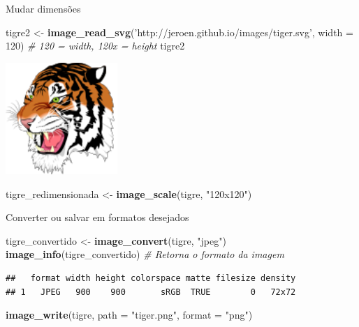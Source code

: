 \documentclass[
  ignorenonframetext,
]{beamer}
\newenvironment{Shaded}{\begin{snugshade}}{\end{snugshade}}
\newcommand{\CommentTok}[1]{\textcolor[rgb]{0.56,0.35,0.01}{\textit{#1}}}
\newcommand{\DataTypeTok}[1]{\textcolor[rgb]{0.13,0.29,0.53}{#1}}
\newcommand{\DecValTok}[1]{\textcolor[rgb]{0.00,0.00,0.81}{#1}}
\newcommand{\KeywordTok}[1]{\textcolor[rgb]{0.13,0.29,0.53}{\textbf{#1}}}
\newcommand{\NormalTok}[1]{#1}
\newcommand{\StringTok}[1]{\textcolor[rgb]{0.31,0.60,0.02}{#1}}
\begin{document}
\begin{frame}[fragile]{Mudar dimensões}
\protect\hypertarget{mudar-dimensuxf5es-1}{}

\small

\begin{Shaded}
\begin{Highlighting}[]
\NormalTok{tigre2 <-}\StringTok{ }\KeywordTok{image_read_svg}\NormalTok{(}\StringTok{'http://jeroen.github.io/images/tiger.svg'}\NormalTok{,}
                         \DataTypeTok{width =} \DecValTok{120}\NormalTok{) }\CommentTok{# 120 = width, 120x = height}
\NormalTok{tigre2}
\end{Highlighting}
\end{Shaded}

\includegraphics[width=1.67in]{SLIDES_files/figure-beamer/2.1-1}

\begin{Shaded}
\begin{Highlighting}[]
\NormalTok{tigre_redimensionada <-}\StringTok{ }\KeywordTok{image_scale}\NormalTok{(tigre, }\StringTok{"120x120"}\NormalTok{)}
\end{Highlighting}
\end{Shaded}

\end{frame}

\begin{frame}[fragile]{Converter ou salvar em formatos desejados}
\protect\hypertarget{converter-ou-salvar-em-formatos-desejados}{}

\small

\begin{Shaded}
\begin{Highlighting}[]
\NormalTok{tigre_convertido <-}\StringTok{ }\KeywordTok{image_convert}\NormalTok{(tigre, }\StringTok{"jpeg"}\NormalTok{)}
\KeywordTok{image_info}\NormalTok{(tigre_convertido) }\CommentTok{# Retorna o formato da imagem}
\end{Highlighting}
\end{Shaded}

\begin{verbatim}
##   format width height colorspace matte filesize density
## 1   JPEG   900    900       sRGB  TRUE        0   72x72
\end{verbatim}

\begin{Shaded}
\begin{Highlighting}[]
\KeywordTok{image_write}\NormalTok{(tigre, }\DataTypeTok{path =} \StringTok{"tiger.png"}\NormalTok{, }\DataTypeTok{format =} \StringTok{"png"}\NormalTok{)}
\end{Highlighting}
\end{Shaded}

\end{frame}
\end{document}
